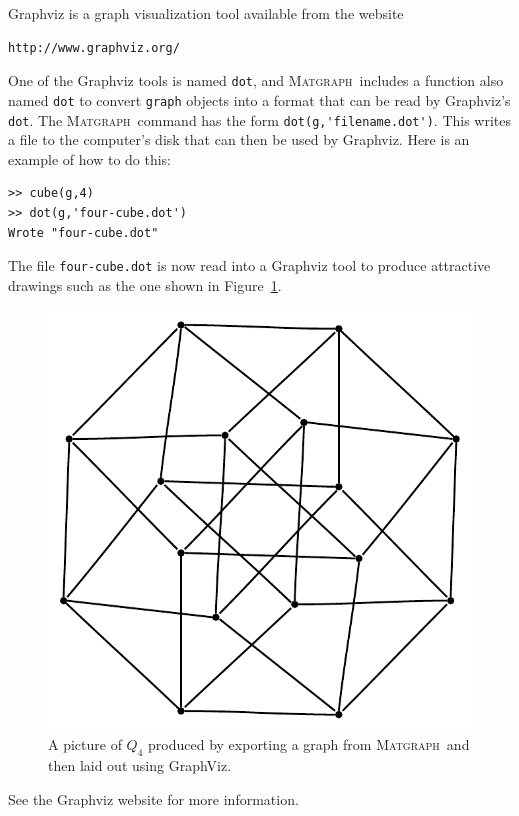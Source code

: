 \documentclass[12pt]{amsart}
\newcommand\matgraph{\textsc{Matgraph}}
\begin{document}
Graphviz is a graph visualization tool available from the website
\begin{verbatim}
http://www.graphviz.org/
\end{verbatim}
One of the Graphviz tools is named \verb|dot|, and \matgraph\ includes
a function also named \verb|dot| to convert \verb|graph| objects into
a format that can be read by Graphviz's \verb|dot|. The \matgraph\
command has the form \verb|dot(g,'filename.dot')|. This writes a file
to the computer's disk that can then be used by Graphviz. Here is an
example of how to do this:
\begin{verbatim}
>> cube(g,4)
>> dot(g,'four-cube.dot')
Wrote "four-cube.dot"
\end{verbatim}
The file \verb|four-cube.dot| is now read into a Graphviz tool to
produce attractive drawings such as the one shown in
Figure~\ref{fig:four-cube}.
\begin{figure}[ht]
  \begin{center}
    \includegraphics[scale=0.5]{figs/four-cube}
  \end{center}
  \caption{A picture of $Q_4$ produced by exporting a graph from
    \matgraph\ and then laid out using GraphViz.}
  \label{fig:four-cube}
\end{figure}
See the Graphviz website for more information.
\end{document}
